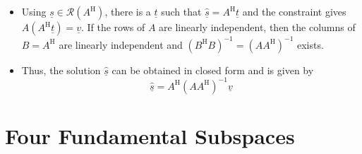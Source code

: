 \documentclass[11pt,twoside]{report}
\newcommand{\vecnot}{\underline}
\newcommand{\Herm}{{\mathrm{H}}}
\begin{document}
\begin{itemize}
\begin{itemize}
\item 
Using $\vecnot{s} \in \mathcal{R}(A^\Herm)$, there is a $\vecnot{t}$ such that $\hat{\vecnot{s}} = A^\Herm \vecnot{t}$ and the constraint gives $A (A^\Herm \vecnot{t}) = \vecnot{v}$.
If the rows of $A$ are linearly independent, then the columns of $B=A^\Herm$ are linearly independent and $(B^\Herm B)^{-1} = (A A^\Herm)^{-1}$ exists.



\item Thus, the solution $\hat{\vecnot{s}}$ can be obtained in closed form and is given by \vspace{-1mm}
\[
 \hat{\vecnot{s}} = A^\Herm \left( A A^\Herm \right)^{-1} \vecnot{v}
 \]

\end{itemize}


\end{itemize}



\section{Four Fundamental Subspaces} 
\end{document}
